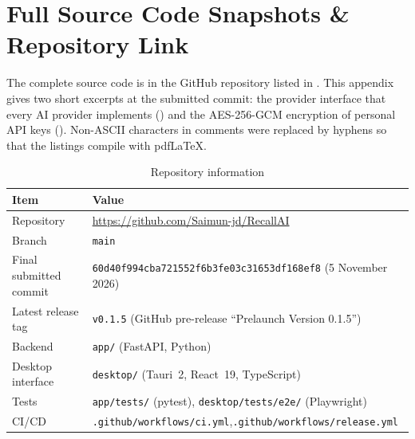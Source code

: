 \chapter{Full Source Code Snapshots \& Repository Link}\label{app:code}

The complete source code is in the GitHub repository listed in . This appendix gives two
short excerpts at the submitted commit: the provider interface that every AI provider implements
() and the AES-256-GCM encryption of personal API keys ().
Non-ASCII characters in comments were replaced by hyphens so that the listings compile with pdfLaTeX.

\begin{table}[htbp]
\centering
\caption{Repository information}\label{tab:repo}
\small
\begin{tabularx}{\textwidth}{@{}l X@{}}
\toprule
\textbf{Item} & \textbf{Value}\\
\midrule
Repository & \url{https://github.com/Saimun-jd/RecallAI}\\
Branch & \texttt{main}\\
Final submitted commit & \texttt{60d40f994cba721552f6b3fe03c31653df168ef8} (5 November 2026)\\
Latest release tag & \texttt{v0.1.5} (GitHub pre-release ``Prelaunch Version 0.1.5'')\\
Backend & \texttt{app/} (FastAPI, Python)\\
Desktop interface & \texttt{desktop/} (Tauri~2, React~19, TypeScript)\\
Tests & \texttt{app/tests/} (pytest), \texttt{desktop/tests/e2e/} (Playwright)\\
CI/CD & \texttt{.github/workflows/ci.yml},\newline \texttt{.github/workflows/release.yml}\\
\bottomrule
\end{tabularx}
\end{table}




